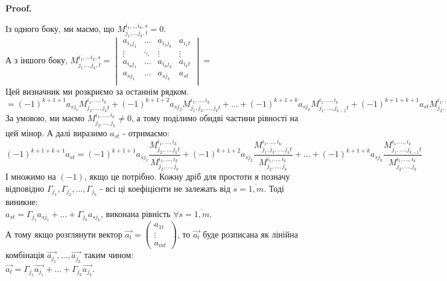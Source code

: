 \documentclass[a4paper, 10pt]{article}
\makeatletter
\theoremstyle{theoremdd}
\renewenvironment{proof}[1][Proof.\\]{\par
\pushQED{\hfill \qed}%
\normalfont \topsep6\p@\@plus6\p@\relax
\trivlist
\item\relax
{\bfseries
#1\@addpunct{.}}\hspace\labelsep\ignorespaces
}{%
\popQED\endtrivlist\@endpefalse
}
\makeatother
\begin{document}
\begin{proof}
Із одного боку, ми маємо, що $M_{j_1,\dots j_k,t}^{i_1, \dots i_k,s} = 0$.\\
А з іншого боку, $M_{j_1,\dots j_k,t}^{i_1, \dots i_k,s} = \begin{vmatrix}
a_{i_1 j_1} & \dots & a_{i_1 j_k} & a_{i_1 t} \\
\vdots & \ddots & \vdots & \vdots \\
a_{i_k j_1} & \dots & a_{i_k j_k} & a_{i_k t} \\
a_{s j_1} & \dots & a_{s j_k} & a_{s t} \\
\end{vmatrix} \boxed{=}$\\
Цей визначник ми розкриємо за останнім рядком.\\
$\boxed{=} (-1)^{k+1+1} a_{sj_1} M_{j_2,\dots,j_k t}^{i_1,\dots,i_k} + (-1)^{k+1+2} a_{sj_2} M_{j_1,j_3,\dots,j_k t}^{i_1,\dots,i_k} + \dots + (-1)^{k+1+k} a_{sj_k}M_{j_1,\dots,j_{k-1} t}^{i_1,\dots,i_k} + (-1)^{k+1+k+1}a_{st} M_{j_2,\dots,j_k}^{i_1,\dots,i_k}$\\
За умовою, ми маємо $M_{j_2,\dots,j_k}^{i_1,\dots,i_k} \neq 0$, а тому поділимо обидві частини рівності на цей мінор. А далі виразимо $a_{st}$ - отримаємо:\\
$(-1)^{k+1+k+1}a_{st} = (-1)^{k+1+1} a_{sj_1} \dfrac{M_{j_2,\dots,j_k t}^{i_1,\dots,i_k}}{M_{j_2,\dots,j_k}^{i_1,\dots,i_k}}  + (-1)^{k+1+2} a_{sj_2} \dfrac{M_{j_1,j_3,\dots,j_k t}^{i_1,\dots,i_k}}{M_{j_2,\dots,j_k}^{i_1,\dots,i_k}} + \dots + (-1)^{k+1+k} a_{sj_k} \dfrac{M_{j_1,\dots,j_{k-1} t}^{i_1,\dots,i_k}}{M_{j_2,\dots,j_k}^{i_1,\dots,i_k}}$\\
І множимо на $(-1)$, якщо це потрібно. Кожну дріб для простоти я позначу відповідно $\Gamma_{j_1}, \Gamma_{j_2},\dots,\Gamma_{j_k}$ - всі ці коефіцієнти не залежать від $s = \overline{1,m}$. Тоді виникне:\\
$a_{st} = \Gamma_{j_1} a_{sj_1} + \dots + \Gamma_{j_k} a_{sj_k}$, виконана рівність $\forall s = \overline{1,m}$. \\
А тому якщо розглянути вектор $\vec{a_t} = \begin{pmatrix}
a_{1t} \\ \vdots \\ a_{mt}
\end{pmatrix}$, то $\vec{a_t}$ буде розписана як лінійна комбінація $\vec{a_{j_1}},\dots,\vec{a_{j_k}}$ таким чином:\\
$\vec{a_t} = \Gamma_{j_1} \vec{a_{j_1}} + \dots + \Gamma_{j_k} \vec{a_{j_k}}$.\\

\end{proof}
\end{document}
